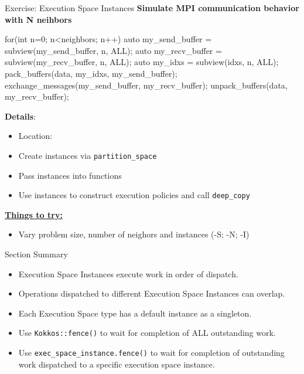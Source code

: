 \begin{frame}[fragile]{Exercise: Execution Space Instances}
\textbf{Simulate MPI communication behavior with N neihbors}
\begin{code}
for(int n=0; n<neighbors; n++) {
  auto my_send_buffer = subview(my_send_buffer, n, ALL);
  auto my_recv_buffer = subview(my_recv_buffer, n, ALL);
  auto my_idxs = subview(idxs, n, ALL);
  pack_buffers(data, my_idxs, my_send_buffer);
  exchange_messages(my_send_buffer, my_recv_buffer);
  unpack_buffers(data, my_recv_buffer);
}
\end{code}


  \textbf{Details}:
  \begin{small}
  \begin{itemize}
\item Location: 
\item Create instances via \texttt{partition\_space}
\item Pass instances into functions
\item Use instances to construct execution policies and call \texttt{deep\_copy}
\end{itemize}
  \end{small}

\ul{\textbf{Things to try:}}
  \begin{small}
  \begin{itemize}
  \item Vary problem size, number of neighors and instances (-S; -N; -I)
  \end{itemize}
  \end{small}

\end{frame}

\begin{frame}{Section Summary}

  \begin{itemize}
    \item{Execution Space Instances execute work in order of dispatch.}
    \item{Operations dispatched to different Execution Space Instances can overlap.}
    \item{Each Execution Space type has a default instance as a singleton.}
    \item{Use \texttt{Kokkos::fence()} to wait for completion of ALL outstanding work.}
    \item{Use \texttt{exec\_space\_instance.fence()} to wait for completion of outstanding work dispatched to a specific execution space instance.}
  \end{itemize}

\end{frame}
